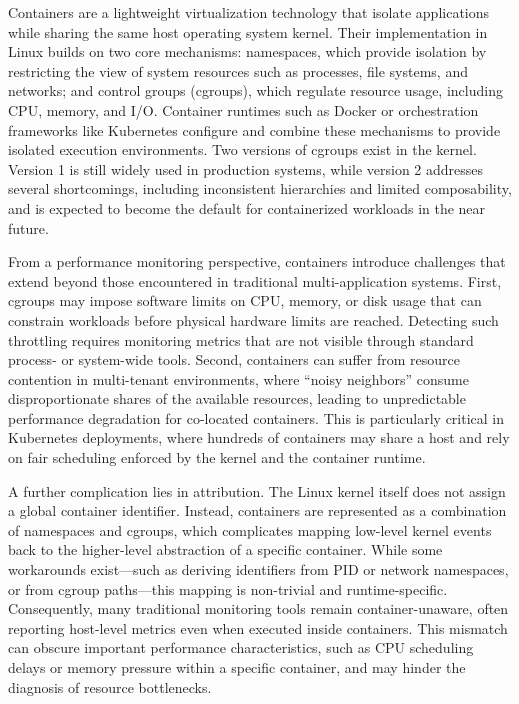 Containers are a lightweight virtualization technology that isolate applications while sharing the same host operating system kernel. Their implementation in Linux builds on two core mechanisms: namespaces, which provide isolation by restricting the view of system resources such as processes, file systems, and networks; and control groups (cgroups), which regulate resource usage, including CPU, memory, and I/O. Container runtimes such as Docker or orchestration frameworks like Kubernetes configure and combine these mechanisms to provide isolated execution environments. Two versions of cgroups exist in the kernel. Version 1 is still widely used in production systems, while version 2 addresses several shortcomings, including inconsistent hierarchies and limited composability, and is expected to become the default for containerized workloads in the near future.

From a performance monitoring perspective, containers introduce challenges that extend beyond those encountered in traditional multi-application systems. First, cgroups may impose software limits on CPU, memory, or disk usage that can constrain workloads before physical hardware limits are reached. Detecting such throttling requires monitoring metrics that are not visible through standard process- or system-wide tools. Second, containers can suffer from resource contention in multi-tenant environments, where “noisy neighbors” consume disproportionate shares of the available resources, leading to unpredictable performance degradation for co-located containers. This is particularly critical in Kubernetes deployments, where hundreds of containers may share a host and rely on fair scheduling enforced by the kernel and the container runtime.

A further complication lies in attribution. The Linux kernel itself does not assign a global container identifier. Instead, containers are represented as a combination of namespaces and cgroups, which complicates mapping low-level kernel events back to the higher-level abstraction of a specific container. While some workarounds exist—such as deriving identifiers from PID or network namespaces, or from cgroup paths—this mapping is non-trivial and runtime-specific. Consequently, many traditional monitoring tools remain container-unaware, often reporting host-level metrics even when executed inside containers. This mismatch can obscure important performance characteristics, such as CPU scheduling delays or memory pressure within a specific container, and may hinder the diagnosis of resource bottlenecks.

